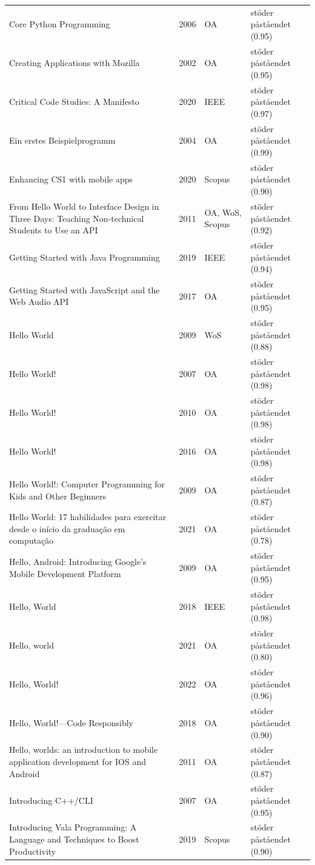 \begin{longtable}{@{}%
  >{\raggedright\arraybackslash}p{}c%
  >{\raggedright\arraybackslash}p{}%
  >{\raggedright\arraybackslash}p{}@{}}
Core Python Programming & 2006 & OA & stöder påståendet (0.95) \\
Creating Applications with Mozilla & 2002 & OA & stöder påståendet (0.95) \\
Critical Code Studies: A Manifesto & 2020 & IEEE & stöder påståendet (0.97) \\
Ein erstes Beispielprogramm & 2004 & OA & stöder påståendet (0.99) \\
Enhancing CS1 with mobile apps & 2020 & Scopus & stöder påståendet (0.90) \\
From Hello World to Interface Design in Three Days: Teaching Non-technical Students to Use an API & 2011 & OA, WoS, Scopus & stöder påståendet (0.92) \\
Getting Started with Java Programming & 2019 & IEEE & stöder påståendet (0.94) \\
Getting Started with JavaScript and the Web Audio API & 2017 & OA & stöder påståendet (0.95) \\
Hello World & 2009 & WoS & stöder påståendet (0.88) \\
Hello World! & 2007 & OA & stöder påståendet (0.98) \\
Hello World! & 2010 & OA & stöder påståendet (0.98) \\
Hello World! & 2016 & OA & stöder påståendet (0.98) \\
Hello World!: Computer Programming for Kids and Other Beginners & 2009 & OA & stöder påståendet (0.87) \\
Hello World: 17 habilidades para exercitar desde o início da graduação em computação & 2021 & OA & stöder påståendet (0.78) \\
Hello, Android: Introducing Google's Mobile Development Platform & 2009 & OA & stöder påståendet (0.95) \\
Hello, World & 2018 & IEEE & stöder påståendet (0.98) \\
Hello, world & 2021 & OA & stöder påståendet (0.80) \\
Hello, World! & 2022 & OA & stöder påståendet (0.96) \\
Hello, World!---Code Responsibly & 2018 & OA & stöder påståendet (0.90) \\
Hello, worlds: an introduction to mobile application development for IOS and Android & 2011 & OA & stöder påståendet (0.87) \\
Introducing C++/CLI & 2007 & OA & stöder påståendet (0.95) \\
Introducing Vala Programming: A Language and Techniques to Boost Productivity & 2019 & Scopus & stöder påståendet (0.90) \\

\end{longtable}
